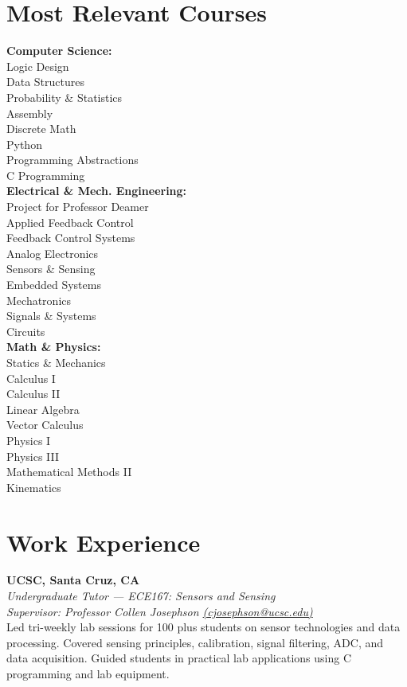 \documentclass[a4paper,9pt]{article}
\begin{document}
\section*{Most Relevant Courses}
\small
\begin{multicols}{3}
    \textbf{Computer Science:} \\
    Logic Design \\
    Data Structures \\
    Probability \& Statistics \\
    Assembly \\
    Discrete Math \\
    Python \\
    Programming Abstractions \\
    C Programming \\

    \columnbreak
    \textbf{Electrical \& Mech. Engineering:} \\
    Project for Professor Deamer \\
    Applied Feedback Control \\
    Feedback Control Systems \\
    Analog Electronics \\
    Sensors \& Sensing \\
    Embedded Systems \\
    Mechatronics \\
    Signals \& Systems \\
    Circuits \\

    \columnbreak
    \textbf{Math \& Physics:} \\
    Statics \& Mechanics \\
    Calculus I \\
    Calculus II \\
    Linear Algebra \\
    Vector Calculus \\
    Physics I \\
    Physics III \\
    Mathematical Methods II \\
    Kinematics \\

\end{multicols}
\normalsize


\section*{Work Experience}
\small
\textbf{UCSC, Santa Cruz, CA} \\
\textit{Undergraduate Tutor — ECE167: Sensors and Sensing } \\
\textit{Supervisor: Professor Collen Josephson \href{mailto:cjosephson@ucsc.edu}{(cjosephson@ucsc.edu)}} \\[0.3em]
\footnotesize
Led tri-weekly lab sessions for 100 plus students on sensor technologies and data processing. Covered sensing principles, calibration, signal filtering, ADC, and data acquisition. Guided students in practical lab applications using C programming and lab equipment.
\normalsize
\end{document}
